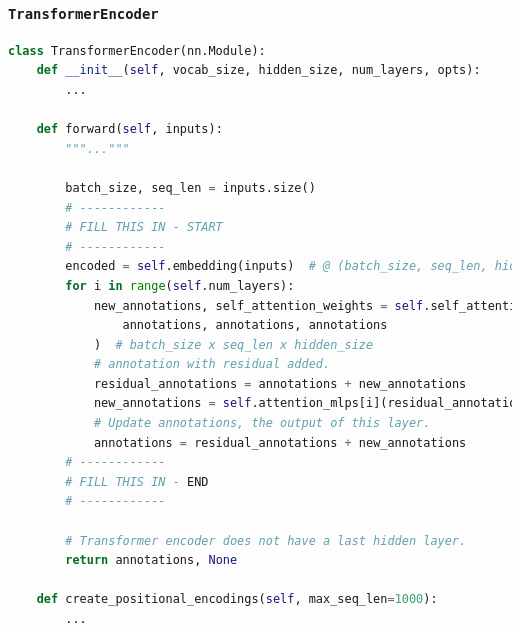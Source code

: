 \documentclass{article}
\begin{document}
\subsubsection{\texttt{TransformerEncoder}}
\begin{lstlisting}[language=python]
class TransformerEncoder(nn.Module):
    def __init__(self, vocab_size, hidden_size, num_layers, opts):
        ...

    def forward(self, inputs):
        """..."""

        batch_size, seq_len = inputs.size()
        # ------------
        # FILL THIS IN - START
        # ------------
        encoded = self.embedding(inputs)  # @ (batch_size, seq_len, hidden_size)
        for i in range(self.num_layers):
            new_annotations, self_attention_weights = self.self_attentions[i](
                annotations, annotations, annotations
            )  # batch_size x seq_len x hidden_size
            # annotation with residual added.
            residual_annotations = annotations + new_annotations
            new_annotations = self.attention_mlps[i](residual_annotations)
            # Update annotations, the output of this layer.
            annotations = residual_annotations + new_annotations
        # ------------
        # FILL THIS IN - END
        # ------------

        # Transformer encoder does not have a last hidden layer. 
        return annotations, None  

    def create_positional_encodings(self, max_seq_len=1000):
    	...
\end{lstlisting}
\end{document}
